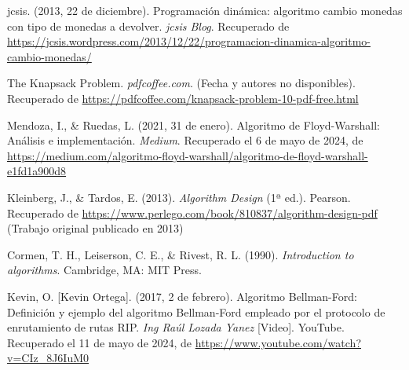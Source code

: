 \begin{thebibliography}{9}

    jcsis. (2013, 22 de diciembre). Programación dinámica: algoritmo cambio monedas con tipo de monedas a devolver. \textit{jcsis Blog}. Recuperado de \url{https://jcsis.wordpress.com/2013/12/22/programacion-dinamica-algoritmo-cambio-monedas/}
        
    The Knapsack Problem. \textit{pdfcoffee.com}. (Fecha y autores no disponibles). Recuperado de \url{https://pdfcoffee.com/knapsack-problem-10-pdf-free.html}
        
    Mendoza, I., \& Ruedas, L. (2021, 31 de enero). Algoritmo de Floyd-Warshall: Análisis e implementación. \textit{Medium}. Recuperado el 6 de mayo de 2024, de \url{https://medium.com/algoritmo-floyd-warshall/algoritmo-de-floyd-warshall-e1fd1a900d8}
        
    Kleinberg, J., \& Tardos, E. (2013). \textit{Algorithm Design} (1ª ed.). Pearson. Recuperado de \url{https://www.perlego.com/book/810837/algorithm-design-pdf} (Trabajo original publicado en 2013)
        
    Cormen, T. H., Leiserson, C. E., \& Rivest, R. L. (1990). \textit{Introduction to algorithms}. Cambridge, MA: MIT Press.
        
    Kevin, O. [Kevin Ortega]. (2017, 2 de febrero). Algoritmo Bellman-Ford: Definición y ejemplo del algoritmo Bellman-Ford empleado por el protocolo de enrutamiento de rutas RIP. \textit{Ing Raúl Lozada Yanez} [Video]. YouTube. Recuperado el 11 de mayo de 2024, de \url{https://www.youtube.com/watch?v=CIz_8J6IuM0}

\end{thebibliography}
